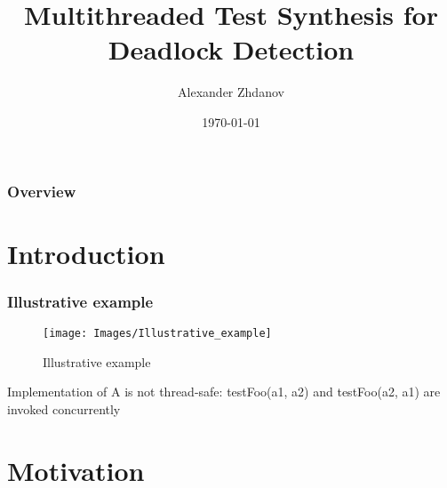 \documentclass{beamer}
\title[multithreaded test synthesis]{Multithreaded Test Synthesis for Deadlock Detection} %
\author{Alexander Zhdanov} %
\institute[TUD.SOLA] %
{Technical University Darmstadt\\ Software Lab \\ %
\medskip
\textit{azhdanov@hotmail.com} %
}
\date{\today} %
\begin{document}
\begin{frame}
\titlepage %
\end{frame}

\begin{frame}
\frametitle{Overview} %
\tableofcontents %
\end{frame}


\section{Introduction} %

\begin{frame}
\frametitle{Illustrative example}
\begin{figure}
\texttt{[image: Images/Illustrative\_example]}\\
\caption{Illustrative example}
\end{figure}
Implementation of A is not thread-safe: testFoo(a1, a2) and testFoo(a2, a1) are invoked concurrently
\end{frame}



\section{Motivation} %
\end{document}
